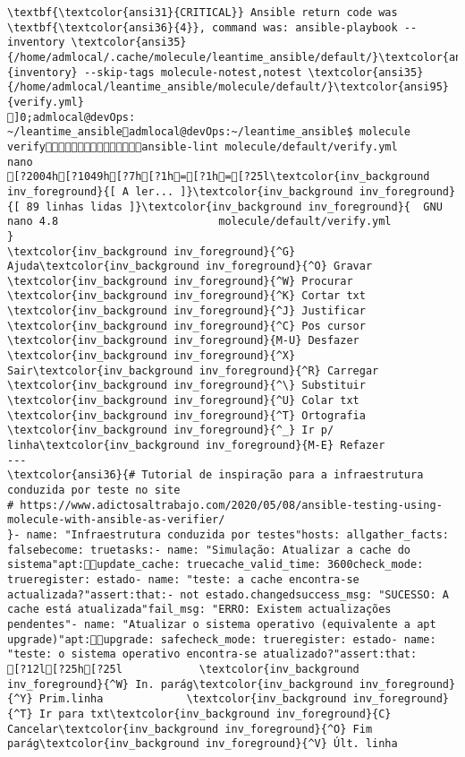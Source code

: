 \documentclass{scrartcl}
\begin{document}
\begin{Verbatim}
\textbf{\textcolor{ansi31}{CRITICAL}} Ansible return code was \textbf{\textcolor{ansi36}{4}}, command was: ansible-playbook --inventory \textcolor{ansi35}{/home/admlocal/.cache/molecule/leantime_ansible/default/}\textcolor{ansi95}{inventory} --skip-tags molecule-notest,notest \textcolor{ansi35}{/home/admlocal/leantime_ansible/molecule/default/}\textcolor{ansi95}{verify.yml}
]0;admlocal@devOps: ~/leantime_ansibleadmlocal@devOps:~/leantime_ansible$ molecule verifyansible-lint molecule/default/verify.yml 
nano
[?2004h[?1049h[?7h[?1h=[?1h=[?25l\textcolor{inv_background inv_foreground}{[ A ler... ]}\textcolor{inv_background inv_foreground}{[ 89 linhas lidas ]}\textcolor{inv_background inv_foreground}{  GNU nano 4.8                         molecule/default/verify.yml                                      }
\textcolor{inv_background inv_foreground}{^G} Ajuda\textcolor{inv_background inv_foreground}{^O} Gravar     \textcolor{inv_background inv_foreground}{^W} Procurar   \textcolor{inv_background inv_foreground}{^K} Cortar txt \textcolor{inv_background inv_foreground}{^J} Justificar \textcolor{inv_background inv_foreground}{^C} Pos cursor \textcolor{inv_background inv_foreground}{M-U} Desfazer
\textcolor{inv_background inv_foreground}{^X} Sair\textcolor{inv_background inv_foreground}{^R} Carregar   \textcolor{inv_background inv_foreground}{^\} Substituir \textcolor{inv_background inv_foreground}{^U} Colar txt  \textcolor{inv_background inv_foreground}{^T} Ortografia \textcolor{inv_background inv_foreground}{^_} Ir p/ linha\textcolor{inv_background inv_foreground}{M-E} Refazer
---
\textcolor{ansi36}{# Tutorial de inspiração para a infraestrutura conduzida por teste no site
# https://www.adictosaltrabajo.com/2020/05/08/ansible-testing-using-molecule-with-ansible-as-verifier/
}- name: "Infraestrutura conduzida por testes"hosts: allgather_facts: falsebecome: truetasks:- name: "Simulação: Atualizar a cache do sistema"apt:update_cache: truecache_valid_time: 3600check_mode: trueregister: estado- name: "teste: a cache encontra-se actualizada?"assert:that:- not estado.changedsuccess_msg: "SUCESSO: A cache está atualizada"fail_msg: "ERRO: Existem actualizações pendentes"- name: "Atualizar o sistema operativo (equivalente a apt upgrade)"apt:upgrade: safecheck_mode: trueregister: estado- name: "teste: o sistema operativo encontra-se atualizado?"assert:that:
[?12l[?25h[?25l            \textcolor{inv_background inv_foreground}{^W} In. parág\textcolor{inv_background inv_foreground}{^Y} Prim.linha             \textcolor{inv_background inv_foreground}{^T} Ir para txt\textcolor{inv_background inv_foreground}{C} Cancelar\textcolor{inv_background inv_foreground}{^O} Fim parág\textcolor{inv_background inv_foreground}{^V} Últ. linha

\end{Verbatim}
\end{document}

